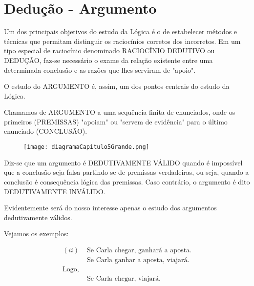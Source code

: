 \chapter{Dedução - Argumento}

Um dos principais objetivos do estudo da Lógica é o de estabelecer métodos e técnicas que permitam distinguir os raciocínios corretos dos incorretos.
Em um tipo especial de raciocínio denominado RACIOCÍNIO DEDUTIVO ou DEDUÇÃO, faz-se necessário o exame da relação existente entre uma determinada conclusão e as razões que lhes serviram de "apoio".

O estudo do ARGUMENTO é, assim, um dos pontos centrais do estudo da Lógica.

Chamamos de ARGUMENTO a uma sequência finita de enunciados, onde os primeiros (PREMISSAS) "apoiam" ou "servem de evidência" para o último enunciado (CONCLUSÃO).

\begin{comment}
    \begin{forest}
        for tree={
        grow=west,
        s sep=.1em,
        l sep=3em,
        sn edges
        }
        [Argumento
        [Premissas
        [$P_1$, tier=prem]
        [$\vdots$, tier=prem, no edge]
        [$P_{n-1}$, tier=prem]
        ]
        [Conclusão
        [$P_n$, tier=prem, edge={<-}]
        ]
        ]
        \draw (-8.1,-0.7) -- (-7,-0.7);
        \end{forest}
\end{comment}

\begin{figure}[H]
	\begin{center}
	    \texttt{[image: diagramaCapitulo5Grande.png]}
	\end{center}
\end{figure}

Diz-se que um argumento é DEDUTIVAMENTE VÁLIDO quando é impossível que a conclusão seja falsa partindo-se de premissas verdadeiras, ou seja, quando a conclusão é consequência lógica das premissas.
Caso contrário, o argumento é dito DEDUTIVAMENTE INVÁLIDO.

Evidentemente será do nosso interesse apenas o estudo dos argumentos dedutivamente válidos.

Vejamos os exemplos:

\begin{align*}
    (ii) & \text{ Se Carla chegar, ganhará a aposta.}\\
         & \text{ Se Carla ganhar a aposta, viajará.}\\
    \text{Logo,}\\
         & \text{ Se Carla chegar, viajará.}
\end{align*}


